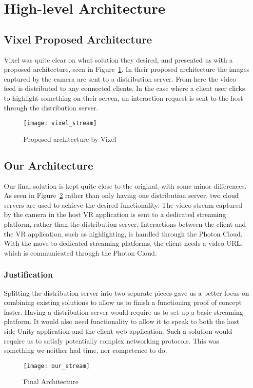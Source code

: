 \section{High-level Architecture}
\subsection{Vixel Proposed Architecture}
Vixel was quite clear on what solution they desired, and presented us with a proposed architecture, seen in Figure~\ref{fig:proposed_architecture}. In their proposed architecture the images captured by the camera are sent to a distribution server. From here the video feed is distributed to any connected clients.
In the case where a client user clicks to highlight something on their screen, an interaction request is sent to the host through the distribution server.

\begin{figure}
    \centering
    \texttt{[image: vixel\_stream]}
    \caption{Proposed architecture by Vixel}
    \label{fig:proposed_architecture}
\end{figure}

\subsection{Our Architecture}
Our final solution is kept quite close to the original, with some minor differences. As seen in Figure~\ref{fig:our_architecture} rather than only having one distribution server, two cloud servers are used to achieve the desired functionality. The video stream captured by the camera in the host VR application is sent to a dedicated streaming platform, rather than the distribution server. Interactions between the client and the VR application, such as highlighting, is handled through the Photon Cloud. With the move to dedicated streaming platforms, the client needs a video URL, which is communicated through the Photon Cloud.

\subsubsection{Justification}
Splitting the distribution server into two separate pieces gave us a better focus on combining existing solutions to allow us to finish a functioning proof of concept faster. Having a distribution server would require us to set up a basic streaming platform. It would also need functionality to allow it to speak to both the host side Unity application and the client web application. Such a solution would require us to satisfy potentially complex networking protocols. This was something we neither had time, nor competence to do.

\begin{figure}
    \centering
    \texttt{[image: our\_stream]}
    \caption{Final Architecture}
    \label{fig:our_architecture}
\end{figure}